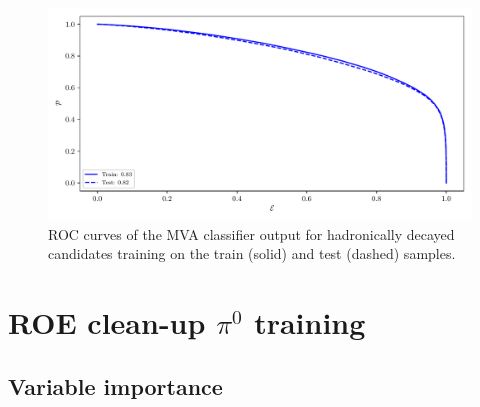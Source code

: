 \begin{figure}[H]
\centering
\captionsetup{width=0.8\linewidth}
\includegraphics[width=\linewidth]{fig/addendums/HD_roc}
\caption{ROC curves of the MVA classifier output for hadronically decayed candidates training on the train (solid) and test (dashed) samples.}
\end{figure}

\section*{ROE clean-up $\pi^0$ training}\label{sec:ROE_pi0}

\subsection*{Variable importance}

